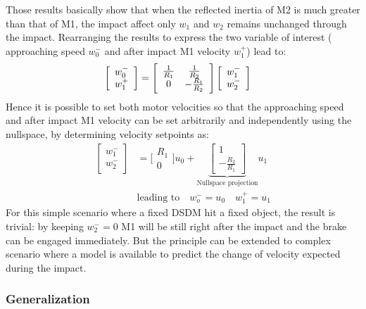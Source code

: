 Those results basically show that when the reflected inertia of M2 is much greater than that of M1, the impact affect only $w_1$ and $w_2$ remains unchanged through the impact. Rearranging the results to express the two variable of interest ( approaching speed $w_0^-$ and after impact M1 velocity $w_1^+$) lead to:
%
\begin{align}
\left[ \begin{array}{c} w_0^- \\ w_1^+ \end{array} \right] &= \Bigg[ \begin{array}{c c} \frac{1}{R_1} & \frac{1}{R_2}\\ 0 & -\frac{R_1}{R_2} \end{array} \Bigg] \left[ \begin{array}{c} w_1^- \\ w_2^- \end{array} \right] 
\label{eq:dsdm_impact_approx_sol}
\end{align}
%
Hence it is possible to set both motor velocities so that the approaching speed and after impact M1 velocity can be set arbitrarily and independently using the nullspace, by determining velocity setpoints as:
%
\begin{align}
\left[ \begin{array}{c} w_1^- \\ w_2^- \end{array} \right] &= \Bigg[ \begin{array}{c} R_1 \\ 0  \end{array} \Bigg] u_0  + 
\underbrace{ \left[ \begin{array}{c} 1 \\ -\frac{R_2}{R_1} \end{array} \right]}_{\text{Nullspace projection}}
 u_1 \\
&\text{leading to} \quad w_o^- = u_0 \quad w_1^+ = u_1
\label{eq:dsdm_impact_kin_ctl}
\end{align}
%
For this simple scenario where a fixed DSDM hit a fixed object, the result is trivial: by keeping $w_2^-=0$ M1 will be still right after the impact and the brake can be engaged immediately. But the principle can be extended to complex scenario where a model is available to predict the change of velocity expected during the impact.


\subsubsection{Generalization}


